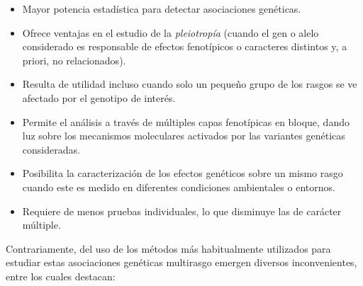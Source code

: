 \documentclass[IB,BIB]{TFUOC}%
\let\oldgls=\gls
\renewcommand{\gls}[1]{{\hypersetup{linkcolor=[RGB]{0,0,0}}
  \oldgls{#1}}}
\begin{document}
{\small
\begin{itemize}
    \item Mayor potencia estadística para detectar asociaciones genéticas.
    \item Ofrece ventajas en el estudio de la \hspace{-.25em}\textit{\gls{pleiotropía}} (cuando el gen o alelo considerado es responsable de efectos fenotípicos o caracteres distintos y, a priori, no relacionados).
    \item Resulta de utilidad incluso cuando solo un pequeño grupo de los rasgos se ve afectado por el genotipo de interés.
    \item Permite el análisis a través de múltiples capas fenotípicas en bloque, dando luz sobre los mecanismos moleculares activados por las variantes genéticas consideradas.
    \item Posibilita la caracterización de los efectos genéticos sobre un mismo rasgo cuando este es medido en diferentes condiciones ambientales o entornos.
    \item Requiere de menos pruebas individuales, lo que disminuye las de carácter múltiple.
\end{itemize}}

Contrariamente, del uso de los métodos más habitualmente utilizados para estudiar estas asociaciones genéticas multirasgo emergen diversos inconvenientes, entre los cuales destacan:
\end{document}
